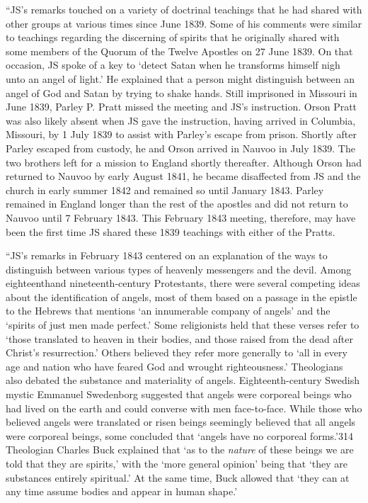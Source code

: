 			``JS's remarks touched on a variety of doctrinal teachings that he had shared with other groups at various times since June 1839. Some of his comments were similar to teachings regarding the discerning of spirits that he originally shared with some members of the Quorum of the Twelve Apostles on 27 June 1839. On that occasion, JS spoke of a key to `detect Satan when he transforms himself nigh unto an angel of light.' He explained that a person might distinguish between an angel of God and Satan by trying to shake hands. Still imprisoned in Missouri in June 1839, Parley P. Pratt missed the meeting and JS's instruction. Orson Pratt was also likely absent when JS gave the instruction, having arrived in Columbia, Missouri, by 1 July 1839 to assist with Parley's escape from prison. Shortly after Parley escaped from custody, he and Orson arrived in Nauvoo in July 1839. The two brothers left for a mission to England shortly thereafter. Although Orson had returned to Nauvoo by early August 1841, he became disaffected from JS and the church in early summer 1842 and remained so until January 1843. Parley remained in England longer than the rest of the apostles and did not return to Nauvoo until 7 February 1843. This February 1843 meeting, therefore, may have been the first time JS shared these 1839 teachings with either of the Pratts. 

			``JS's remarks in February 1843 centered on an explanation of the ways to distinguish between various types of heavenly messengers and the devil. Among eighteenthand nineteenth-century Protestants, there were several competing ideas about the identification of angels, most of them based on a passage in the epistle to the Hebrews that mentions `an innumerable company of angels' and the `spirits of just men made perfect.' Some religionists held that these verses refer to `those translated to heaven in their bodies, and those raised from the dead after Christ's resurrection.' Others believed they refer more generally to `all in every age and nation who have feared God and wrought righteousness.' Theologians also debated the substance and materiality of angels. Eighteenth-century Swedish mystic Emmanuel Swedenborg suggested that angels were corporeal beings who had lived on the earth and could converse with men face-to-face. While those who believed angels were translated or risen beings seemingly believed that all angels were corporeal beings, some concluded that `angels have no corporeal forms.'314 Theologian Charles Buck explained that `as to the \textit{nature} of these beings we are told that they are spirits,' with the `more general opinion' being that `they are substances entirely spiritual.' At the same time, Buck allowed that `they can at any time assume bodies and appear in human shape.' 

